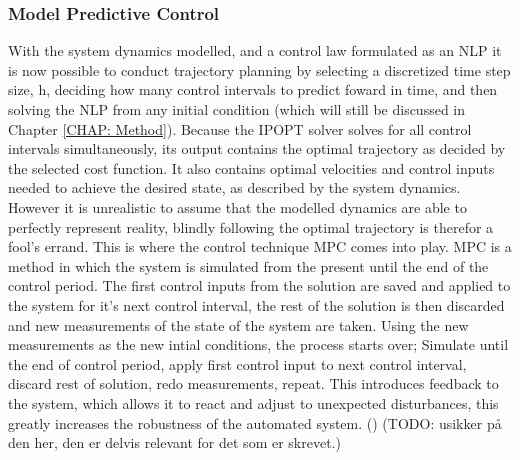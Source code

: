 \subsubsection*{Model Predictive Control}
With the system dynamics modelled, and a control law formulated as an \gls{NLP} it is now possible to conduct trajectory planning by
selecting a discretized time step size, h, deciding how many control intervals to predict foward in time, and then solving the NLP from any initial condition
(which will still be discussed in Chapter \ref{CHAP: Method}). Because the \gls{IPOPT} solver
solves for all control intervals simultaneously, its output contains the optimal trajectory as decided by the selected cost function. It also contains optimal
velocities and control inputs needed to achieve the desired state, as described by the system dynamics. However it is unrealistic to assume that the
modelled dynamics are able to perfectly represent reality, blindly following the optimal trajectory is therefor a fool's errand. This is where the
control technique \gls{MPC} comes into play. \gls{MPC} is a method in which the system is simulated from the present until the end of the control
period. The first control inputs from the solution are saved and applied to the system for it's next control interval, the rest of the solution is then
discarded and new measurements of the state of the system are taken. Using the new measurements as the new intial conditions, the process starts over;
Simulate until the end of control period, apply first control input to next control interval, discard rest of solution, redo measurements, repeat.
This introduces feedback to the system, which allows it to react and adjust to unexpected disturbances, this greatly increases the robustness of the automated system.
(\cite{qin1997overview}) (TODO: usikker på den her, den er delvis relevant for det som er skrevet.)



